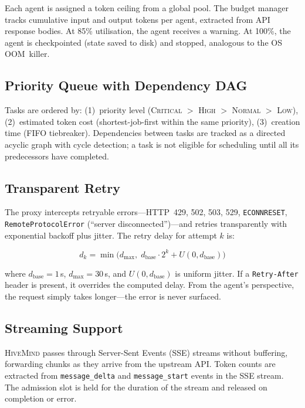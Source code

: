 \documentclass[11pt,twocolumn]{article}
\newcommand{\hm}{\textsc{HiveMind}}
\begin{document}
Each agent is assigned a token ceiling from a global pool.
The budget manager tracks cumulative input and output tokens
per agent, extracted from API response bodies.  At 85\%
utilisation, the agent receives a warning.  At 100\%, the agent
is checkpointed (state saved to disk) and stopped, analogous
to the OS OOM~killer.

\subsection{Priority Queue with Dependency DAG}
\label{sec:queue}

Tasks are ordered by: (1)~priority level
(\textsc{Critical} $>$ \textsc{High} $>$ \textsc{Normal} $>$
\textsc{Low}), (2)~estimated token cost (shortest-job-first
within the same priority), (3)~creation time (FIFO tiebreaker).
Dependencies between tasks are tracked as a directed acyclic
graph with cycle detection; a task is not eligible for scheduling
until all its predecessors have completed.

\subsection{Transparent Retry}
\label{sec:retry}

The proxy intercepts retryable errors---HTTP~429, 502, 503, 529,
\texttt{ECONNRESET}, \texttt{RemoteProtocolError}
(``server disconnected'')---and retries transparently with
exponential backoff plus jitter.  The retry delay for attempt
$k$ is:

\begin{equation}
\label{eq:retry}
d_k = \min\!\bigl(d_{\max},\; d_{\text{base}} \cdot 2^k + U(0, d_{\text{base}})\bigr)
\end{equation}

\noindent where $d_{\text{base}} = 1$\,s, $d_{\max} = 30$\,s,
and $U(0, d_{\text{base}})$ is uniform jitter.  If a
\texttt{Retry-After} header is present, it overrides the
computed delay.  From the agent's perspective, the request
simply takes longer---the error is never surfaced.

\subsection{Streaming Support}

\hm{} passes through Server-Sent Events (SSE) streams without
buffering, forwarding chunks as they arrive from the upstream
API.  Token counts are extracted from \texttt{message\_delta}
and \texttt{message\_start} events in the SSE stream.  The
admission slot is held for the duration of the stream and
released on completion or error.
\end{document}
